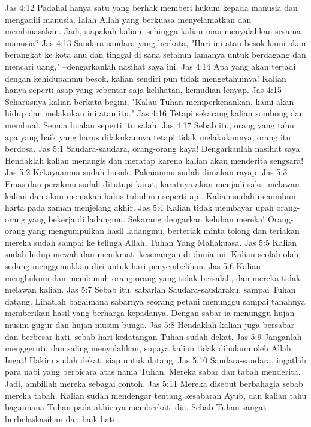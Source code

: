 Jas 4:12  Padahal hanya satu yang berhak memberi hukum kepada manusia dan mengadili manusia. Ialah Allah yang berkuasa menyelamatkan dan membinasakan. Jadi, siapakah kalian, sehingga kalian mau menyalahkan sesama manusia?
Jas 4:13  Saudara-saudara yang berkata, "Hari ini atau besok kami akan berangkat ke kota anu dan tinggal di sana setahun lamanya untuk berdagang dan mencari uang," --dengarkanlah nasihat saya ini.
Jas 4:14  Apa yang akan terjadi dengan kehidupanmu besok, kalian sendiri pun tidak mengetahuinya! Kalian hanya seperti asap yang sebentar saja kelihatan, kemudian lenyap.
Jas 4:15  Seharusnya kalian berkata begini, "Kalau Tuhan memperkenankan, kami akan hidup dan melakukan ini atau itu."
Jas 4:16  Tetapi sekarang kalian sombong dan membual. Semua bualan seperti itu salah.
Jas 4:17  Sebab itu, orang yang tahu apa yang baik yang harus dilakukannya tetapi tidak melakukannya, orang itu berdosa.
Jas 5:1  Saudara-saudara, orang-orang kaya! Dengarkanlah nasihat saya. Hendaklah kalian menangis dan meratap karena kalian akan menderita sengsara!
Jas 5:2  Kekayaanmu sudah busuk. Pakaianmu sudah dimakan rayap.
Jas 5:3  Emas dan perakmu sudah ditutupi karat; karatnya akan menjadi saksi melawan kalian dan akan memakan habis tubuhmu seperti api. Kalian sudah menimbun harta pada zaman menjelang akhir.
Jas 5:4  Kalian tidak membayar upah orang-orang yang bekerja di ladangmu. Sekarang dengarkan keluhan mereka! Orang-orang yang mengumpulkan hasil ladangmu, berteriak minta tolong dan teriakan mereka sudah sampai ke telinga Allah, Tuhan Yang Mahakuasa.
Jas 5:5  Kalian sudah hidup mewah dan menikmati kesenangan di dunia ini. Kalian seolah-olah sedang menggemukkan diri untuk hari penyembelihan.
Jas 5:6  Kalian menghukum dan membunuh orang-orang yang tidak bersalah, dan mereka tidak melawan kalian.
Jas 5:7  Sebab itu, sabarlah Saudara-saudaraku, sampai Tuhan datang. Lihatlah bagaimana sabarnya seorang petani menunggu sampai tanahnya memberikan hasil yang berharga kepadanya. Dengan sabar ia menunggu hujan musim gugur dan hujan musim bunga.
Jas 5:8  Hendaklah kalian juga bersabar dan berbesar hati, sebab hari kedatangan Tuhan sudah dekat.
Jas 5:9  Janganlah menggerutu dan saling menyalahkan, supaya kalian tidak dihukum oleh Allah. Ingat! Hakim sudah dekat, siap untuk datang.
Jas 5:10  Saudara-saudara, ingatlah para nabi yang berbicara atas nama Tuhan. Mereka sabar dan tabah menderita. Jadi, ambillah mereka sebagai contoh.
Jas 5:11  Mereka disebut berbahagia sebab mereka tabah. Kalian sudah mendengar tentang kesabaran Ayub, dan kalian tahu bagaimana Tuhan pada akhirnya memberkati dia. Sebab Tuhan sangat berbelaskasihan dan baik hati.
